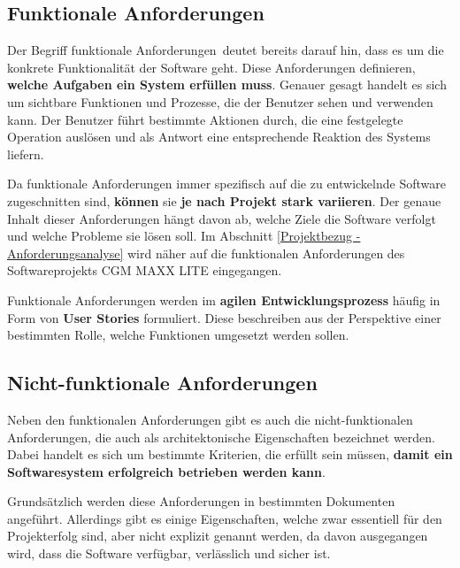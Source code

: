 
\subsection{Funktionale Anforderungen} \label{Funktionale Anforderungen}

Der Begriff \glqq funktionale Anforderungen\grqq\ deutet bereits darauf hin, dass es um die konkrete Funktionalität der Software geht. Diese Anforderungen definieren, \textbf{welche Aufgaben ein System erfüllen muss}. Genauer gesagt handelt es sich um sichtbare Funktionen und Prozesse, die der Benutzer sehen und verwenden kann. Der Benutzer führt bestimmte Aktionen durch, die eine festgelegte Operation auslösen und als Antwort eine entsprechende Reaktion des Systems liefern.

Da funktionale Anforderungen immer spezifisch auf die zu entwickelnde Software zugeschnitten sind, \textbf{können} sie \textbf{je nach Projekt stark variieren}. Der genaue Inhalt dieser Anforderungen hängt davon ab, welche Ziele die Software verfolgt und welche Probleme sie lösen soll. Im Abschnitt \ref{Projektbezug - Anforderungsanalyse} wird näher auf die funktionalen Anforderungen des Softwareprojekts CGM MAXX LITE eingegangen.

Funktionale Anforderungen werden im \textbf{agilen Entwicklungsprozess} häufig in Form von \textbf{User Stories} formuliert. Diese beschreiben aus der Perspektive einer bestimmten Rolle, welche Funktionen umgesetzt werden sollen.
\cite{EA:Web04, EA:Web07}



\subsection{Nicht-funktionale Anforderungen} \label{Nicht-funktionale Anforderungen}

Neben den funktionalen Anforderungen gibt es auch die nicht-funktionalen Anforderungen, die auch als architektonische Eigenschaften bezeichnet werden. Dabei handelt es sich um bestimmte Kriterien, die erfüllt sein müssen, \textbf{damit ein Softwaresystem erfolgreich betrieben werden kann}.

Grundsätzlich werden diese Anforderungen in bestimmten Dokumenten angeführt. Allerdings gibt es einige Eigenschaften, welche zwar essentiell für den Projekterfolg sind, aber nicht explizit genannt werden, da davon ausgegangen wird, dass die Software verfügbar, verlässlich und sicher ist.

